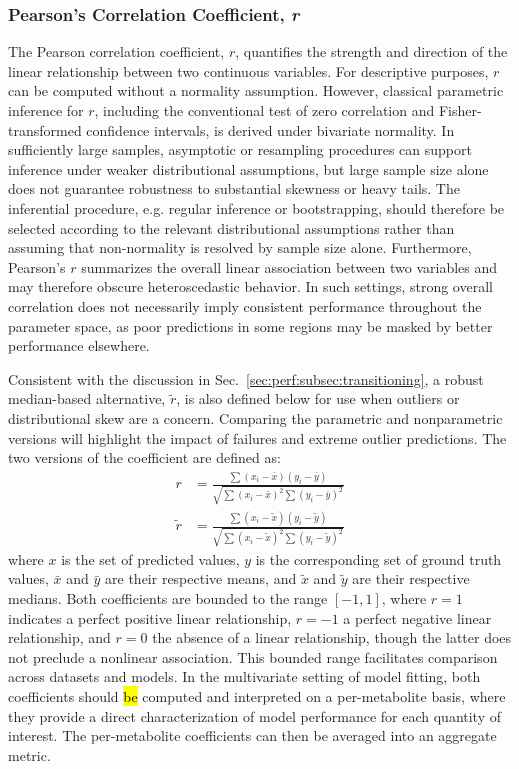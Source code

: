 \subsubsection{Pearson's Correlation Coefficient, \textit{r}}
\label{sec:Eval:subsec:RegMetrics:subsubsec:pearson}
The Pearson correlation coefficient, $r$, \cite{Pearson1895} quantifies the strength and direction of the linear relationship between two continuous variables. For descriptive purposes, $r$ can be computed without a normality assumption. However, classical parametric inference for $r$, including the conventional test of zero correlation and Fisher-transformed confidence intervals, is derived under bivariate normality. In sufficiently large samples, asymptotic or resampling procedures can support inference under weaker distributional assumptions, but large sample size alone does not guarantee robustness to substantial skewness or heavy tails. The inferential procedure, e.g. regular inference or bootstrapping, should therefore be selected according to the relevant distributional assumptions rather than assuming that non-normality is resolved by sample size alone. Furthermore, Pearson's $r$ summarizes the overall linear association between two variables and may therefore obscure heteroscedastic behavior. In such settings, strong overall correlation does not necessarily imply consistent performance throughout the parameter space, as poor predictions in some regions may be masked by better performance elsewhere.

Consistent with the discussion in Sec.~\ref{sec:perf:subsec:transitioning}, a robust median-based alternative, $\widetilde{r}$, is also defined below for use when outliers or distributional skew are a concern. Comparing the parametric and nonparametric versions will highlight the impact of failures and extreme outlier predictions. The two versions of the coefficient are defined as:
\begin{subequations}\label{eqn:r}
    \begin{align}
        r &= \frac{\sum(x_i - \bar{x})(y_i - \bar{y})}{\sqrt{\sum(x_i - \bar{x})^2\sum(y_i - \bar{y})^2}}\label{eqn:mean r}\\[2pt]  \widetilde{r} &= \frac{\sum(x_i - \tilde{x})(y_i - \tilde{y})}{\sqrt{\sum(x_i - \tilde{x})^2\sum(y_i - \tilde{y})^2}}\label{eqn:median r}
    \end{align}
\end{subequations}
\noindent where $x$ is the set of predicted values, $y$ is the corresponding set of ground truth values, $\bar{x}$ and $\bar{y}$ are their respective means, and $\tilde{x}$ and $\tilde{y}$ are their respective medians. Both coefficients are bounded to the range $[-1, 1]$, where $r = 1$ indicates a perfect positive linear relationship, $r = -1$ a perfect negative linear relationship, and $r = 0$ the absence of a linear relationship, though the latter does not preclude a nonlinear association. This bounded range facilitates comparison across datasets and models. In the multivariate setting of model fitting, both coefficients should \hl{be} computed and interpreted on a per-metabolite basis, where they provide a direct characterization of model performance for each quantity of interest. The per-metabolite coefficients can then be averaged into an aggregate metric.

